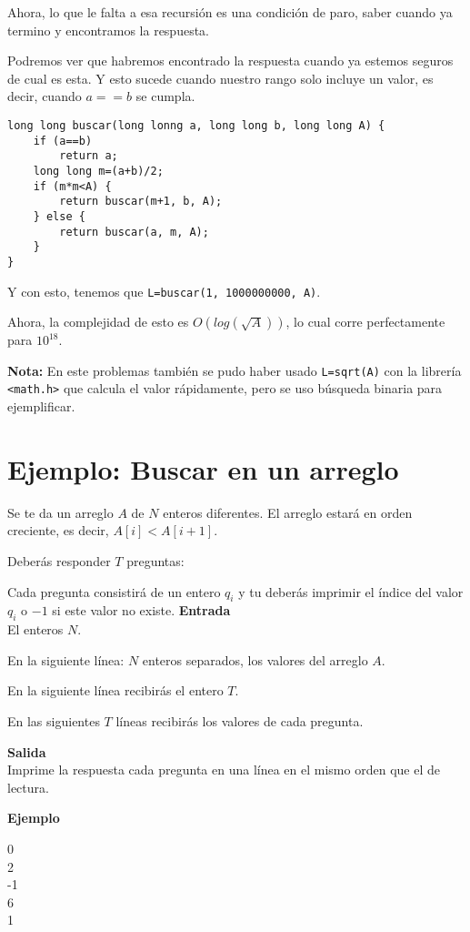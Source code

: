 Ahora, lo que le falta a esa recursión es una condición de paro, saber cuando ya termino y encontramos la respuesta.

Podremos ver que habremos encontrado la respuesta cuando ya estemos seguros de cual es esta. Y esto sucede cuando nuestro rango solo incluye un valor, es decir, cuando \(a==b\) se cumpla.

\begin{minipage}{\textwidth}
\begin{lstlisting}
long long buscar(long lonng a, long long b, long long A) {
	if (a==b)
		return a;
	long long m=(a+b)/2;
	if (m*m<A) {
		return buscar(m+1, b, A);
	} else {
		return buscar(a, m, A);
	}
}
\end{lstlisting}
\end{minipage}
Y con esto, tenemos que \verb|L=buscar(1, 1000000000, A)|.

Ahora, la complejidad de esto es \(O(log(\sqrt{A}))\), lo cual corre perfectamente para \(10^{18}\).

\textbf{Nota:} En este problemas también se pudo haber usado \lstinline|L=sqrt(A)| con la librería \verb|<math.h>| que calcula el valor rápidamente, pero se uso búsqueda binaria para ejemplificar.

\section{Ejemplo: Buscar en un arreglo}
Se te da un arreglo \(A\) de \(N\) enteros diferentes. El arreglo estará en orden creciente, es decir, \(A[i] < A[i+1]\).

Deberás responder \(T\) preguntas:

Cada pregunta consistirá de un entero \(q_i\) y tu deberás imprimir el índice del valor \(q_i\) o \(-1\) si este valor no existe.
\textbf{Entrada}\\
El enteros \(N\).

En la siguiente línea: \(N\) enteros separados, los valores del arreglo \(A\).

En la siguiente línea recibirás el entero \(T\).

En las siguientes \(T\) líneas recibirás los valores de cada pregunta.

\textbf{Salida}\\
Imprime la respuesta cada pregunta en una línea en el mismo orden que el de lectura.

\textbf{Ejemplo}\\
\begin{casebox2}
	{
		0\\
		2\\
		-1\\
		6\\
		1		
	}
\end{casebox2}

